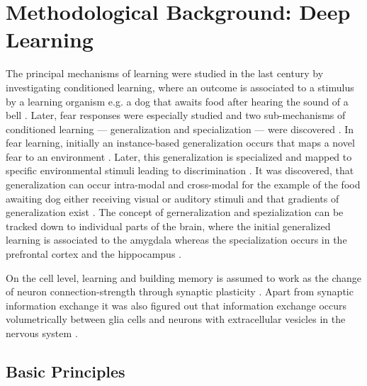 \section{Methodological Background: Deep Learning} %
    The principal mechanisms of learning were studied in the last century by investigating conditioned learning, where an outcome is associated to a stimulus by a learning organism e.g. a dog that awaits food after hearing the sound of a bell \citep{pavlov1928conditioned, pavlov2010conditioned, banich2011generalization}. Later, fear responses were especially studied and two sub-mechanisms of conditioned learning --- generalization and specialization --- were discovered \citep{banich2011generalization}.
    In fear learning, initially an instance-based generalization occurs that maps a novel fear to an environment \citep{banich2011generalization}. Later, this generalization is specialized and mapped to specific environmental stimuli leading to discrimination \citep{banich2011generalization}.
    It was discovered, that generalization can occur intra-modal and cross-modal for the example of the food awaiting dog either receiving visual or auditory stimuli \citep{pavlov1928conditioned} and that gradients of generalization exist \citep{guttman1956discriminability}.
    The concept of gerneralization and spezialization can be tracked down to individual parts of the brain, where the initial generalized learning is associated to the amygdala whereas the specialization occurs in the prefrontal cortex and the hippocampus \citep{banich2011generalization}.

    On the cell level, learning and building memory is assumed to work as the change of neuron connection-strength through synaptic plasticity \citep{do1949organization,martin2000synaptic}. Apart from synaptic information exchange it was also figured out that information exchange occurs volumetrically between glia cells and neurons with extracellular vesicles in the nervous system \citep{schiera2019communcation}.

    \subsection{Basic Principles} %

